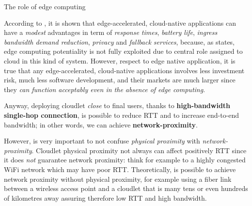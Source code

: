 \documentclass[10pt]{beamer}
\begin{document}
\begin{frame}{The role of edge computing}
\begin{description}
\end{description}

According to \citet{TheSeminalRoleEdgeNativeApplications}, it is shown that edge-accelerated, cloud-native applications can have a \textit{modest} advantages in term of \textit{response times}, \textit{battery life}, \textit{ingress bandwidth demand reduction}, \textit{privacy} and \textit{fallback services}\cite{TheSeminalRoleEdgeNativeApplications}\citep{TheEmergenceOfEdgeComputing}, because, as \citet{TheSeminalRoleEdgeNativeApplications} states, edge computing potentiality is not fully exploited due to central role assigned to cloud in this kind of system. However, respect to edge native application, it is true that any edge-accelerated, cloud-native applications involves less investment risk, much less software development, and their markets are much larger since they \textit{can function acceptably even in the absence of edge computing}.

Anyway, deploying cloudlet \textit{close} to final users, thanks to \textbf{high-bandwidth single-hop connection}, is possible to reduce RTT and to increase end-to-end bandwidth; in other words, we can achieve \textbf{network-proximity}.\citep{TheSeminalRoleEdgeNativeApplications}

However, is very important to not confuse \textit{physical proximity} with \textit{network-proximity}. Cloudlet physical proximity not always can affect positively RTT since it does \textit{not} guarantee network proximity: think for example to a highly congested WiFi network which may have poor RTT. Theoretically, is possible to achieve network proximity without physical proximity, for example using a fiber link between a wireless access point and a cloudlet that is many tens or even hundreds of kilometres away assuring therefore low RTT and high bandwidth.\cite{TheSeminalRoleEdgeNativeApplications}


\end{frame} 
\end{document}
